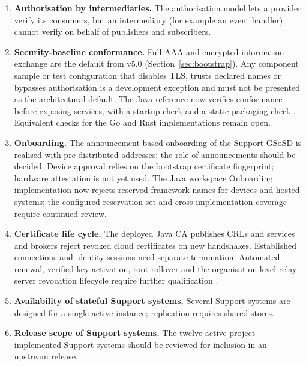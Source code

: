\documentclass[a4paper]{arrowhead}
\newcommand{\svc}[1]{\textcolor{ArrowheadPurple}{\textit{\ahbreak{#1}}}}    %
\begin{document}
\begin{enumerate}
        other MQTT traffic use the MQTT broker, so a local cloud runs two brokers. Whether
        \svc{sysMonitorData} should also move to AMQP is open.
  \item \textbf{Authorisation by intermediaries.} The authorisation model lets a provider verify
        its consumers, but an intermediary (for example an event handler) cannot verify on behalf
        of publishers and subscribers.
  \item \textbf{Security-baseline conformance.} Full AAA and encrypted information exchange
        are the default from v5.0 (Section~\ref{sec:bootstrap}). Any component sample or test
        configuration that disables TLS, trusts declared names or bypasses authorisation
        is a development exception and must not be presented as the architectural default.
        The Java reference now verifies conformance before exposing services, with a startup
        check and a static packaging check \cite{javaConformance20261107}. Equivalent checks
        for the Go and Rust implementations remain open.
  \item \textbf{Onboarding.} The announcement-based onboarding of the Support GSoSD
        \cite{gsosdsup50} is realised with pre-distributed addresses; the role of announcements
        should be decided. Device approval relies on the bootstrap certificate fingerprint;
        hardware attestation is not yet used. The Java workspace Onboarding implementation
        now rejects reserved framework names for devices and hosted systems; the configured
        reservation set and cross-implementation coverage require continued review.
  \item \textbf{Certificate life cycle.} The deployed Java CA publishes CRLs and services
        and brokers reject revoked cloud certificates on new handshakes. Established
        connections and identity sessions need separate termination. Automated renewal,
        verified key activation, root rollover and the organisation-level relay-server
        revocation lifecycle require further qualification
        \cite{javaDeployment20261024,rustFederation20261019}.
  \item \textbf{Availability of stateful Support systems.} Several Support systems are designed for a
        single active instance; replication requires shared stores.
  \item \textbf{Release scope of Support systems.} The twelve active project-implemented Support systems
        should be reviewed for inclusion in an upstream release.
\end{enumerate}
\end{document}
